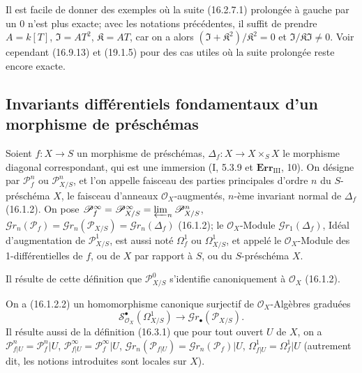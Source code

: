 Il est facile de donner des exemples où la suite (16.2.7.1) prolongée à gauche
par un 0 n'est plus exacte; avec les notations précédentes, il suffit de
prendre $A=k[T]$, $\mathfrak{I}=AT^2$, $\mathfrak{K}=AT$, car on a alors
$(\mathfrak{I}+\mathfrak{K}^2)/\mathfrak{K}^2=0$ et
$\mathfrak{I}/\mathfrak{K}\mathfrak{I}\neq 0$. Voir cependant (16.9.13) et
(19.1.5) pour des cas utiles où la suite prolongée reste encore exacte.

\subsection{Invariants différentiels fondamentaux d'un morphisme de préschémas}
\label{IV.16.3}

\begin{definition}[16.3.1]
\label{IV.16.3.1}
Soient $f:X\to S$ un morphisme de préschémas, $\Delta_f:X\to X\times_S X$
le morphisme diagonal correspondant, qui est une immersion (I, 5.3.9 et
$\mathbf{Err}_{\mathrm{III}}$, 10). On désigne par $\mathscr{P}_f^n$ ou
$\mathscr{P}_{X/S}^n$, et l'on appelle faisceau des parties principales d'ordre $n$
du $S$-préschéma $X$, le faisceau d'anneaux $\mathcal{O}_X$-augmentés, $n$-ème
invariant normal de $\Delta_f$ (16.1.2). On pose
$\mathscr{P}_f^\infty=\mathscr{P}_{X/S}^\infty=
\varprojlim_n\mathscr{P}_{X/S}^n$,
$\mathscr{G}r_n(\mathscr{P}_f)=\mathscr{G}r_n(\mathscr{P}_{X/S})=
\mathscr{G}r_n(\Delta_f)$ (16.1.2); le $\mathcal{O}_X$-Module
$\mathscr{G}r_1(\Delta_f)$, Idéal d'augmentation de $\mathscr{P}_{X/S}^1$, est
aussi noté $\Omega_f^1$ ou $\Omega_{X/S}^1$, et appelé le $\mathcal{O}_X$-Module
des 1-différentielles de $f$, ou de $X$ par rapport à $S$, ou du $S$-préschéma $X$.
\end{definition}

Il résulte de cette définition que $\mathscr{P}_{X/S}^0$ s'identifie
canoniquement à $\mathcal{O}_X$ (16.1.2).

On a (16.1.2.2) un homomorphisme canonique surjectif de
$\mathcal{O}_X$-Algèbres graduées
\[
  \mathscr{S}_{\mathcal{O}_X}^{\bullet}(\Omega_{X/S}^1)
  \longrightarrow\mathscr{G}r_\bullet(\mathscr{P}_{X/S}).
  \tag{16.3.1.1}
  \label{IV.16.3.1.1}
\]
Il résulte aussi de la définition (16.3.1) que pour tout ouvert $U$ de $X$, on a
$\mathscr{P}_{f|U}^n=\mathscr{P}_f^n|U$,
$\mathscr{P}_{f|U}^\infty=\mathscr{P}_f^\infty|U$,
$\mathscr{G}r_n(\mathscr{P}_{f|U})=\mathscr{G}r_n(\mathscr{P}_f)|U$,
$\Omega_{f|U}^1=\Omega_f^1|U$ (autrement dit, les notions introduites sont
locales sur $X$).

